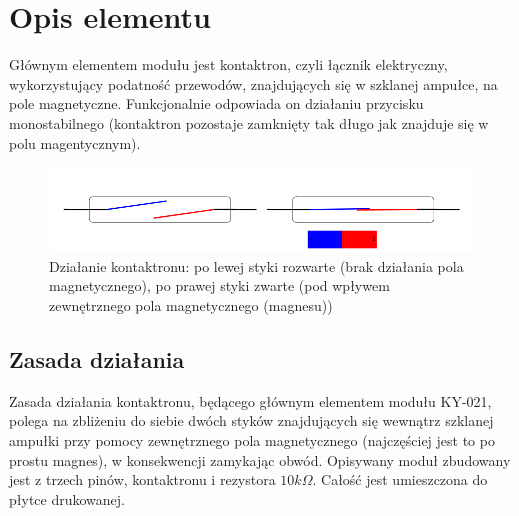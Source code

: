 \documentclass[11pt, a4paper]{article}
\institute{Instytut Robotyki i Inteligencji Maszynowej}
\begin{document}
\newpage

\section{Opis elementu} 
Głównym elementem modułu jest kontaktron, czyli łącznik elektryczny, wykorzystujący podatność przewodów, znajdujących się w szklanej ampułce, na pole magnetyczne. Funkcjonalnie odpowiada on działaniu przycisku monostabilnego (kontaktron pozostaje zamknięty tak długo jak znajduje się w polu magentycznym).%

\vspace{0.3cm}
\begin{figure}[h]
\centering
\includegraphics[width=.8\linewidth]{fig/Kontaktron-KY-021/zasada_dzialania/zasada_dzial.png}
\caption{Działanie kontaktronu: po lewej styki rozwarte (brak działania pola magnetycznego), po prawej styki zwarte (pod wpływem zewnętrznego pola magnetycznego (magnesu)) \cite{reed_jpeg_schematic}}
\label{fig:sub1}
\end{figure}
\vspace{0.3cm}

\subsection{Zasada działania}
Zasada działania kontaktronu, będącego głównym elementem modułu KY-021, polega na zbliżeniu do siebie dwóch styków znajdujących się wewnątrz szklanej ampułki przy pomocy zewnętrznego pola magnetycznego (najczęściej jest to po prostu magnes), w konsekwencji zamykając obwód. Opisywany moduł zbudowany jest z trzech pinów, kontaktronu i rezystora $10k\Omega$. Całość jest umieszczona do płytce drukowanej.
\end{document}
